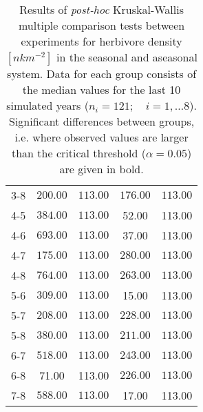 \begin{table}[ht]
\begin{tabular*}{\textwidth}{@{\extracolsep{\fill} }ccccc}
  3-8 & \(\mathbf{200.00}\) & \(\mathbf{113.00}\) & \(\mathbf{176.00}\) & \(\mathbf{113.00}\) \\ 
   [1ex]4-5 & \(\mathbf{384.00}\) & \(\mathbf{113.00}\) & 52.00 & 113.00 \\ 
  4-6 & \(\mathbf{693.00}\) & \(\mathbf{113.00}\) & 37.00 & 113.00 \\ 
  4-7 & \(\mathbf{175.00}\) & \(\mathbf{113.00}\) & \(\mathbf{280.00}\) & \(\mathbf{113.00}\) \\ 
  4-8 & \(\mathbf{764.00}\) & \(\mathbf{113.00}\) & \(\mathbf{263.00}\) & \(\mathbf{113.00}\) \\ 
   [1ex]5-6 & \(\mathbf{309.00}\) & \(\mathbf{113.00}\) & 15.00 & 113.00 \\ 
  5-7 & \(\mathbf{208.00}\) & \(\mathbf{113.00}\) & \(\mathbf{228.00}\) & \(\mathbf{113.00}\) \\ 
  5-8 & \(\mathbf{380.00}\) & \(\mathbf{113.00}\) & \(\mathbf{211.00}\) & \(\mathbf{113.00}\) \\ 
   [1ex]6-7 & \(\mathbf{518.00}\) & \(\mathbf{113.00}\) & \(\mathbf{243.00}\) & \(\mathbf{113.00}\) \\ 
  6-8 & 71.00 & 113.00 & \(\mathbf{226.00}\) & \(\mathbf{113.00}\) \\ 
   [1ex]7-8 & \(\mathbf{588.00}\) & \(\mathbf{113.00}\) & 17.00 & 113.00 \\ 
   \bottomrule
\end{tabular*}
\caption[Kruskal-Wallis multiple comparison of herbivore density.]{Results of \textit{post-hoc} Kruskal-Wallis multiple comparison
                            tests between experiments for herbivore density $[nkm^{-2}]$ in the seasonal and aseasonal system.
                            Data for each group consists of the median values for the last 10 simulated years ($n_{i} = 121;\quad i = 1,\ldots8$).
                            Significant differences between groups, i.e. where observed
                            values are larger than the critical threshold ($\alpha = 0.05$) are given in bold.} 
\label{chap:res:dyn}
\end{table}
